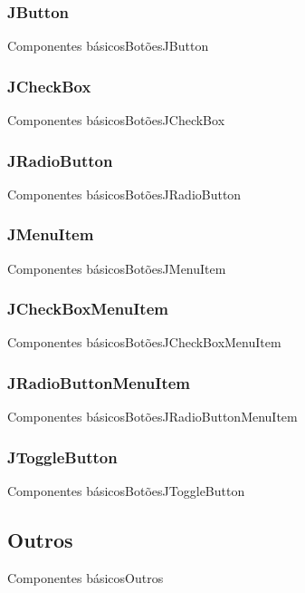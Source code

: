 \documentclass[10pt]{beamer}
\begin{document}
\subsubsection{JButton}
\begin{frame}{Componentes básicos}{Botões}{JButton}
\end{frame}{}
\subsubsection{JCheckBox}
\begin{frame}{Componentes básicos}{Botões}{JCheckBox}
\end{frame}{}
\subsubsection{JRadioButton}
\begin{frame}{Componentes básicos}{Botões}{JRadioButton}
\end{frame}{}
\subsubsection{JMenuItem}
\begin{frame}{Componentes básicos}{Botões}{JMenuItem}
\end{frame}{}
\subsubsection{JCheckBoxMenuItem}
\begin{frame}{Componentes básicos}{Botões}{JCheckBoxMenuItem}
\end{frame}{}
\subsubsection{JRadioButtonMenuItem}
\begin{frame}{Componentes básicos}{Botões}{JRadioButtonMenuItem}
\end{frame}{}
\subsubsection{JToggleButton}
\begin{frame}{Componentes básicos}{Botões}{JToggleButton}
\end{frame}{}
\subsection{Outros}
\begin{frame}{Componentes básicos}{Outros}
\end{frame}{}
\end{document}
